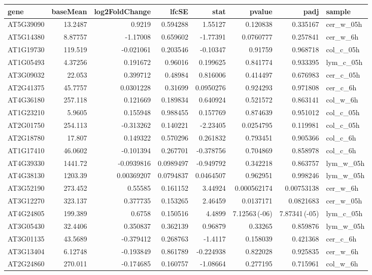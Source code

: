 \documentclass[a4paper]{article}
\begin{document}
\begin{center}
\begin{tabular}{lrrrrrrl}
gene & baseMean & log2FoldChange & lfcSE & stat & pvalue & padj & sample\\
\hline
AT5G39090 & 13.2487 & 0.9219 & 0.594288 & 1.55127 & 0.120838 & 0.335167 & cer\_w\_05h\\
AT5G14380 & 8.87757 & -1.17008 & 0.659602 & -1.77391 & 0.0760777 & 0.257841 & cer\_w\_6h\\
AT1G19730 & 119.519 & -0.021061 & 0.203546 & -0.10347 & 0.91759 & 0.968718 & col\_c\_05h\\
AT1G05493 & 4.37256 & 0.191672 & 0.96016 & 0.199625 & 0.841774 & 0.933395 & lym\_c\_05h\\
AT3G09032 & 22.053 & 0.399712 & 0.48984 & 0.816006 & 0.414497 & 0.676983 & cer\_c\_05h\\
AT2G41375 & 45.7757 & 0.0301228 & 0.31699 & 0.0950276 & 0.924293 & 0.971808 & cer\_c\_6h\\
AT4G36180 & 257.118 & 0.121669 & 0.189834 & 0.640924 & 0.521572 & 0.863141 & col\_w\_6h\\
AT1G23210 & 5.9605 & 0.155948 & 0.988455 & 0.157769 & 0.874639 & 0.951012 & col\_c\_05h\\
AT2G01750 & 254.113 & -0.313262 & 0.140221 & -2.23405 & 0.0254795 & 0.119981 & col\_c\_05h\\
AT2G18780 & 17.807 & 0.149322 & 0.570296 & 0.261832 & 0.793451 & 0.905366 & col\_c\_6h\\
AT1G17410 & 46.0602 & -0.101394 & 0.267701 & -0.378756 & 0.704869 & 0.858978 & col\_c\_6h\\
AT4G39330 & 1441.72 & -0.0939816 & 0.0989497 & -0.949792 & 0.342218 & 0.863757 & lym\_w\_05h\\
AT4G38130 & 1203.39 & 0.00369207 & 0.0794837 & 0.0464507 & 0.962951 & 0.998246 & lym\_w\_05h\\
AT3G52190 & 273.452 & 0.55585 & 0.161152 & 3.44924 & 0.000562174 & 0.00753138 & cer\_w\_6h\\
AT3G12270 & 323.137 & 0.377735 & 0.153265 & 2.46459 & 0.0137171 & 0.0821683 & cer\_w\_05h\\
AT4G24805 & 199.389 & 0.6758 & 0.150516 & 4.4899 & 7.12563\,(-06) & 7.87341\,(-05) & lym\_c\_05h\\
AT3G05430 & 32.4406 & 0.350837 & 0.362139 & 0.96879 & 0.33265 & 0.859876 & lym\_w\_05h\\
AT3G01135 & 43.5689 & -0.379412 & 0.268763 & -1.4117 & 0.158039 & 0.421368 & cer\_c\_6h\\
AT3G13404 & 6.12748 & -0.193849 & 0.861789 & -0.224938 & 0.822028 & 0.925835 & cer\_w\_6h\\
AT2G24860 & 270.011 & -0.174685 & 0.160757 & -1.08664 & 0.277195 & 0.715961 & col\_w\_6h\\
\end{tabular}
\end{center}
\end{document}
